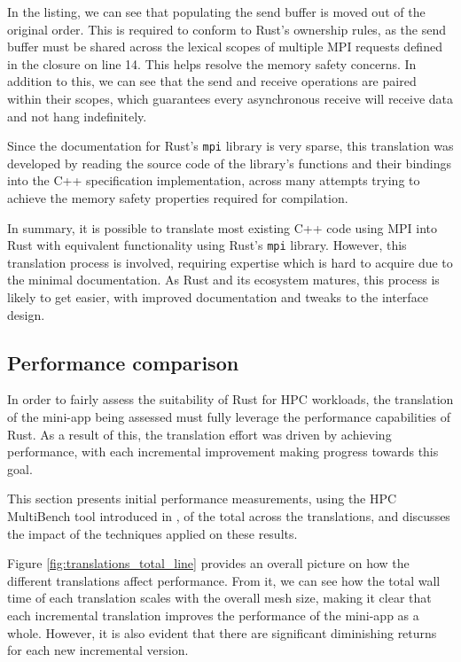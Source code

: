 In the listing, we can see that populating the send buffer is moved out of the original order. This is required to conform to Rust's ownership rules, as the send buffer must be shared across the lexical scopes of multiple MPI requests defined in the closure on line 14. This helps resolve the memory safety concerns. In addition to this, we can see that the send and receive operations are paired within their scopes, which guarantees every asynchronous receive will receive data and not hang indefinitely.

Since the documentation for Rust's \texttt{mpi} library is very sparse, this translation was developed by reading the source code of the library's functions and their bindings into the C++ specification implementation, across many attempts trying to achieve the memory safety properties required for compilation.

In summary, it is possible to translate most existing C++ code using MPI into Rust with equivalent functionality using Rust's \texttt{mpi} library. However, this translation process is involved, requiring expertise which is hard to acquire due to the minimal documentation. As Rust and its ecosystem matures, this process is likely to get easier, with improved documentation and tweaks to the interface design.

\subsection{Performance comparison}
\label{sec:translation-performance}

In order to fairly assess the suitability of Rust for \acrshort{HPC} workloads, the translation of the \acrshort{mini-app} being assessed must fully leverage the performance capabilities of Rust. As a result of this, the translation effort was driven by achieving performance, with each incremental improvement making progress towards this goal.

This section presents initial performance measurements, using the HPC MultiBench tool introduced in , of the total across the translations, and discusses the impact of the techniques applied on these results.

Figure \ref{fig:translations_total_line} provides an overall picture on how the different translations affect performance. From it, we can see how the total wall time of each translation scales with the overall mesh size, making it clear that each incremental translation improves the performance of the \acrshort{mini-app} as a whole. However, it is also evident that there are significant diminishing returns for each new incremental version.


